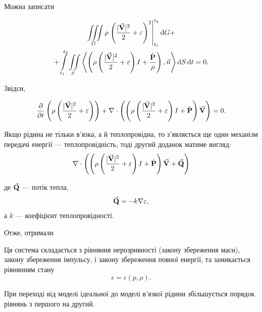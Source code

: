 Можна записати
\begin{law}
	\begin{multline}
		\displaystyle\iiint\limits_G \rho \left. \left( \frac{|{\vec{\mathbf{V}}}|^2}{2} + \varepsilon\right)^2 \right|_{t_1}^{t_2} \mathop{}\!\mathrm{d} G + \\
		+\displaystyle\int\limits_{t_1}^{t_2} \displaystyle\iint\limits_S \left\langle \left(\rho \left(\frac{|{\vec{\mathbf{V}}}|^2}{2} + \varepsilon \right)I+\frac{\dot{\textbf{P}}}{\rho}\right),\vec n\right\rangle \mathop{}\!\mathrm{d} S \mathop{}\!\mathrm{d} t = 0.
	\end{multline}
\end{law}

Звідси, 
\begin{law}
	\begin{equation}
		\frac{\partial}{\partial t} \left( \rho \left( \frac{|{\vec{\mathbf{V}}}|^2}{2} + \varepsilon\right)\right) + \nabla \cdot \left( \left( \rho \left(\frac{|{\vec{\mathbf{V}}}|^2}{2} + \varepsilon\right)I + \dot{\textbf{P}}\right) {\vec{\mathbf{V}}} \right) = 0.
	\end{equation}
\end{law}

Якщо рідина не тільки в'язка, а й теплопровідна, то з'являється ще один механізм передачі енергії --- теплопровідність, тоді другий доданок матиме вигляд:
\begin{equation}
	\nabla \cdot \left( \left( \rho \left(\frac{|{\vec{\mathbf{V}}}|^2}{2} + \varepsilon\right)I + \dot{\textbf{P}}\right) {\vec{\mathbf{V}}} + {\vec{\mathbf{Q}}}\right)
\end{equation}

де ${\vec{\mathbf{Q}}}$ --- потік тепла,
\begin{equation}
	{\vec{\mathbf{Q}}} = - k \nabla \varepsilon,
\end{equation}
а $k$ --- коефіцієнт теплопровідності. \medskip

Отже, отримали
\begin{th_equation}
	Ця система складається з рівняння нерозривності (закону збереження маси), закону збереження імпульсу, і закону збереження повної енергії, та замикається рівнянням стану
	\begin{equation}
		\epsilon = \epsilon(p, \rho).
	\end{equation}
\end{th_equation}

\begin{remark}
	При переході від моделі ідеальної до моделі в'язкої рідини збільшується порядок рівнянь з першого на другий.
\end{remark}


